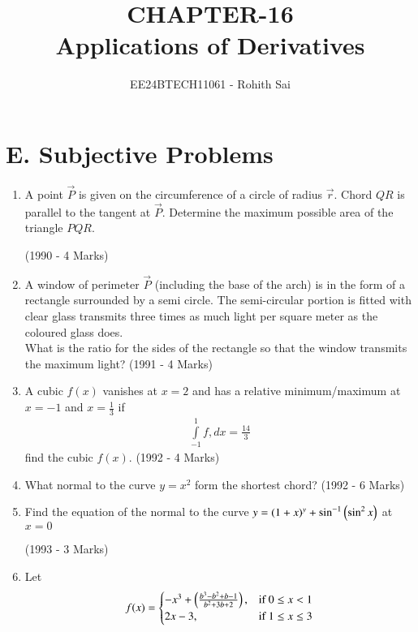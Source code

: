 \documentclass[journal,12pt,twocolumn]{IEEEtran}
\theoremstyle{remark}
\begin{document}

\vspace{3cm}

\title{CHAPTER-16\\Applications of Derivatives}
\author{EE24BTECH11061 - Rohith Sai}
\maketitle
\newpage
\bigskip

\renewcommand{\thefigure}{\theenumi}
\renewcommand{\thetable}{\theenumi}

\section{E. Subjective Problems}

\begin{enumerate}

\item A point $\vec{P}$ is given on the circumference of a circle of radius $\vec{r}$. Chord $QR$ is parallel to the tangent at $\vec{P}$. Determine the maximum possible area of the triangle $PQR$.

\hfill (1990 - 4 Marks)


\item A window of perimeter $\vec{P}$ (including the base of the arch) is in the form of a rectangle surrounded by a semi circle. The semi-circular portion is fitted with clear glass transmits three times as much light per square meter as the coloured glass does.\\What is the ratio for the sides of the rectangle so that the window transmits the maximum light?
\hfill (1991 - 4 Marks)

\item A cubic $f(x)$ vanishes at $x=2$ and has a relative minimum/maximum at $x=-1$ and $x=\frac{1}{3}$ if
\begin{align*}
\int\limits_{-1}^1 f ,dx = \frac{14}{3}
\end{align*}
find the cubic $f(x)$.
\hfill (1992 - 4 Marks)

\item What normal to the curve $y=x^2$ form the shortest chord?
\hfill (1992 - 6 Marks)

\item Find the equation of the normal to the curve $y=(1+x)^y + \sin^{-1}\left(\sin^2x\right)$ at $x=0$

\hfill (1993 - 3 Marks)


\item Let 
\begin{align*}
f(x) = \begin{cases}
-x^3 + \left(\frac{b^3-b^2+b-1}{b^2+3b+2}\right), & \text{if } 0\leq x < 1\\
2x-3, & \text{if } 1\leq x \leq 3
\end{cases}
\end{align*}


\end{enumerate}
\end{document}
